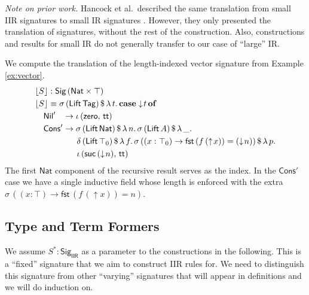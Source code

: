 \documentclass[acmsmall,screen,review]{acmart}
\newcommand{\msf}[1]{{\mathsf{#1}}}
\newcommand{\mbf}[1]{{\mathbf{#1}}}
\newcommand{\Nat}{\msf{Nat}}
\newcommand{\zero}{\msf{zero}}
\newcommand{\suc}{\msf{suc}}
\newcommand{\Nil}{\msf{Nil}}
\newcommand{\Cons}{\msf{Cons}}
\newcommand{\Lift}{\msf{Lift}}
\newcommand{\lup}{\uparrow}
\newcommand{\ldown}{\downarrow}
\newcommand{\Sig}{\msf{Sig}}
\newcommand{\Tag}{\msf{Tag}}
\newcommand{\case}{\mbf{case}}
\newcommand{\of}{\mbf{of}}
\newcommand{\ttt}{\msf{tt}}
\newcommand{\fst}{\msf{fst}}
\newcommand{\IIR}{\msf{IIR}}
\newcommand{\floord}[1]{\lfloor #1 \rfloor}
\begin{document}
\emph{Note on prior work.} Hancock et al.\ described the same translation from small IIR signatures
to small IR signatures \cite[Section~6]{DBLP:conf/tlca/HancockMGMA13}. However, they only presented
the translation of signatures, without the rest of the construction. Also, constructions and results
for small IR do not generally transfer to our case of ``large'' IR.

\begin{example} We compute the translation of the length-indexed vector signature from Example \ref{ex:vector}.
\begin{alignat*}{4}
  & \floord{S} : \Sig\,(\Nat \times \top)\\
  & \floord{S} \equiv \sigma\,(\Lift\,\Tag)\,\$\,\lambda\,t.\,\case \ldown\!t\,\of \\
  & \quad \Nil'\hspace{0.85em} \to \iota\,(\zero,\,\ttt) \\
  & \quad \Cons'\to \sigma\,(\Lift\,\Nat)\,\$\,\lambda\,n.\,\sigma\,(\Lift\,A)\,\$\,\lambda\,\_.\\
  & \quad \hspace{4em}  \delta\,(\Lift\,\top_0)\,\$\,\lambda\,f.\,\sigma\,((x : \top_0) \to \fst\,(f\,(\lup\!x)) = (\ldown\!n))\,\$\,\lambda\,p.\\
  & \quad \hspace{4em}  \iota\,(\suc\,(\ldown\!n),\,\ttt)
\end{alignat*}
The first $\Nat$ component of the recursive result serves as the index. In the $\Cons'$ case we
have a single inductive field whose length is enforced with the extra $\sigma\,((x : \top) \to
\fst\,(f\,(\lup\!x)) = n)$.


\end{example}

\subsection{Type and Term Formers}\label{sec:iir-construction-type-term}
We assume $S^* : \Sig_\IIR$ as a parameter to the constructions in the following. This is a
``fixed'' signature that we aim to construct IIR rules for. We need to distinguish this signature from
other ``varying'' signatures that will appear in definitions and we will do induction on.

\end{document}
